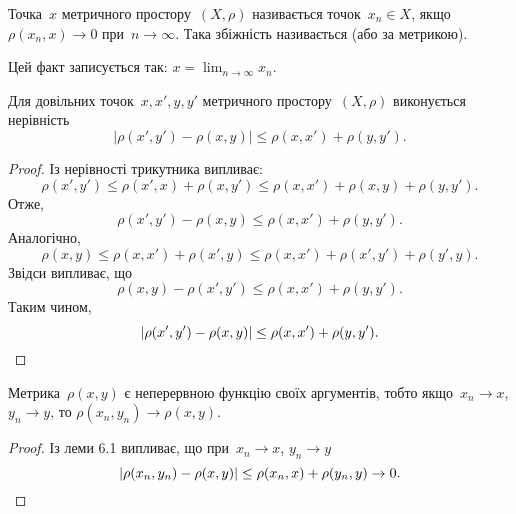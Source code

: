 \begin{definition}
Точка~$x$ метричного простору~$(X, \rho)$
називається  точок~$x_n \in X$, якщо
$\rho(x_n, x) \to 0$  при~$n \to \infty$. Така збіжність називається
 (або за метрикою).

Цей факт записується так: $x = \lim_{n \to \infty} x_n$.
\end{definition}

\begin{lemma}
Для довільних точок~$x, x', y, y'$ метричного
простору~$(X, \rho)$ виконується нерівність
\begin{equation*}
    |\rho(x', y') - \rho(x, y)| \le \rho(x, x') + \rho(y, y').
\end{equation*}
\end{lemma}

\begin{proof}
Із нерівності трикутника випливає:
\begin{equation*}
    \rho(x', y') \le
    \rho(x', x) + \rho(x, y') \le
    \rho(x, x') + \rho(x, y) + \rho(y, y').
\end{equation*}
Отже,
\begin{equation*}
    \rho(x', y') - \rho(x, y) \le
    \rho(x, x') + \rho(y, y').
\end{equation*}
Аналогічно,
\begin{equation*}
    \rho(x, y) \le
    \rho(x, x') + \rho(x', y) \le
    \rho(x, x') + \rho(x', y') + \rho( y', y).
\end{equation*}
Звідси випливає, що
\begin{equation*}
    \rho(x, y) - \rho(x', y') \le
    \rho(x, x') + \rho(y, y').
\end{equation*}
Таким чином,
\begin{equation*}
    |\rho(x', y') - \rho(x, y)| \le
    \rho(x, x') + \rho(y, y'). \qedhere
\end{equation*}
\end{proof}

\begin{lemma}
Метрика~$\rho(x, y)$ є неперервною функцію своїх
аргументів, тобто якщо~$x_n \to x$, $y_n \to y$, то
$\rho(x_n, y_n) \to \rho(x, y)$.
\end{lemma}

\begin{proof}
Із леми 6.1 випливає, що при~$x_n \to x$, $y_n \to y$
\begin{equation*}
    |\rho(x_n, y_n) - \rho(x, y)| \le
    \rho(x_n, x) + \rho(y_n, y) \to
    0. \qedhere
\end{equation*}
\end{proof}

